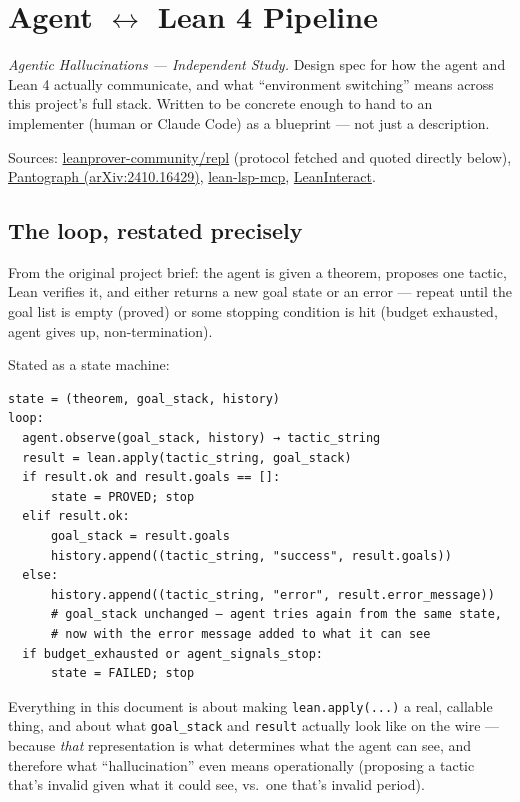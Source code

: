 \chapter{Agent \texorpdfstring{$\leftrightarrow$}{<->} Lean 4 Pipeline}
\label{ch:pipeline}

\emph{Agentic Hallucinations --- Independent Study.} Design spec for how the agent and Lean 4 actually communicate, and what ``environment switching'' means across this project's full stack. Written to be concrete enough to hand to an implementer (human or Claude Code) as a blueprint --- not just a description.

Sources: \href{https://github.com/leanprover-community/repl}{leanprover-community/repl} (protocol fetched and quoted directly below), \href{https://arxiv.org/abs/2410.16429}{Pantograph (arXiv:2410.16429)}, \href{https://github.com/oOo0oOo/lean-lsp-mcp}{lean-lsp-mcp}, \href{https://github.com/augustepoiroux/leaninteract}{LeanInteract}.

\section{The loop, restated precisely}

From the original project brief: the agent is given a theorem, proposes one tactic, Lean verifies it, and either returns a new goal state or an error --- repeat until the goal list is empty (proved) or some stopping condition is hit (budget exhausted, agent gives up, non-termination).

Stated as a state machine:

\begin{verbatim}
state = (theorem, goal_stack, history)
loop:
  agent.observe(goal_stack, history) → tactic_string
  result = lean.apply(tactic_string, goal_stack)
  if result.ok and result.goals == []:
      state = PROVED; stop
  elif result.ok:
      goal_stack = result.goals
      history.append((tactic_string, "success", result.goals))
  else:
      history.append((tactic_string, "error", result.error_message))
      # goal_stack unchanged — agent tries again from the same state,
      # now with the error message added to what it can see
  if budget_exhausted or agent_signals_stop:
      state = FAILED; stop
\end{verbatim}

Everything in this document is about making \texttt{lean.apply(...)} a real, callable thing, and about what \texttt{goal\_stack} and \texttt{result} actually look like on the wire --- because \emph{that} representation is what determines what the agent can see, and therefore what ``hallucination'' even means operationally (proposing a tactic that's invalid given what it could see, vs.\ one that's invalid period).

